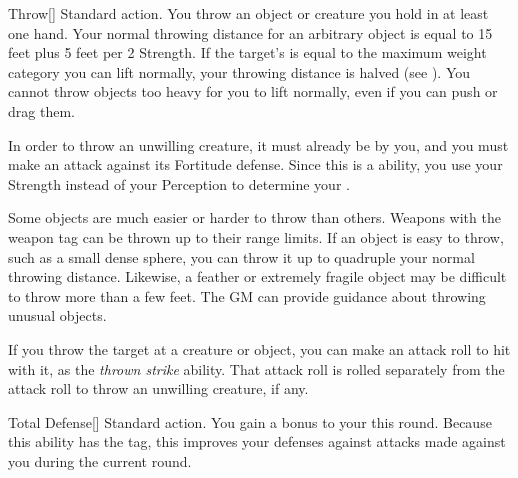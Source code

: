         \begin{activeability}{Throw}[]
            \label{Throw}
            \abilityusagetime Standard action.
            \rankline
            You throw an object or creature you hold in at least one hand.
            Your normal throwing distance for an arbitrary object is equal to 15 feet plus 5 feet per 2 Strength.
            If the target's  is equal to the maximum weight category you can lift normally, your throwing distance is halved (see ).
            You cannot throw objects too heavy for you to lift normally, even if you can push or drag them.

            In order to throw an unwilling creature, it must already be \grappled by you, and you must make an attack against its Fortitude defense.
            Since this is a  ability, you use your Strength instead of your Perception to determine your .

            Some objects are much easier or harder to throw than others.
            Weapons with the  weapon tag can be thrown up to their range limits.
            If an object is easy to throw, such as a small dense sphere, you can throw it up to quadruple your normal throwing distance.
            Likewise, a feather or extremely fragile object may be difficult to throw more than a few feet.
            The GM can provide guidance about throwing unusual objects.

            If you throw the target at a creature or object, you can make an attack roll to hit with it, as the \textit{thrown strike} ability.
            That attack roll is rolled separately from the attack roll to throw an unwilling creature, if any.
        \end{activeability}

        \begin{activeability}{Total Defense}[]
            \label{Total Defense}
            \abilityusagetime Standard action.
            \rankline
            You gain a  bonus to your  this round.
            Because this ability has the  tag, this improves your defenses against attacks made against you during the current round.
        \end{activeability}

